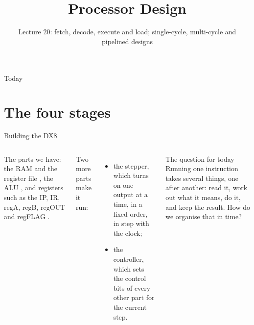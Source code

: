 \documentclass[10pt]{wosm-slides}
\title[Lecture 20 \textperiodcentered\ Processor Design]{Processor Design}
\subtitle{Lecture 20: fetch, decode, execute and load; single-cycle, multi-cycle and
  pipelined designs}
\begin{document}
\maketitle

\begin{frame}{Today}
  \tableofcontents
\end{frame}

\section{The four stages}

\begin{frame}{Building the DX8}
  \begin{columns}[c, totalwidth=\textwidth]
      The parts we have: the RAM and the register file , the ALU
      , and registers such as the IP, IR, regA, regB, regOUT and regFLAG
      .\par\medskip
      Two more parts make it run:
      \begin{itemize}
        \item the \alert{stepper}, which turns on one output at a time, in a fixed
          order, in step with the clock;
        \item the \alert{controller}, which sets the control bits of every other part
          for the current step.
      \end{itemize}
      \begin{block}{The question for today}
        Running one instruction takes several things, one after another: read it,
        work out what it means, do it, and keep the result. How do we organise that
        in time?
      \end{block}
  \end{columns}
\end{frame}
\end{document}
